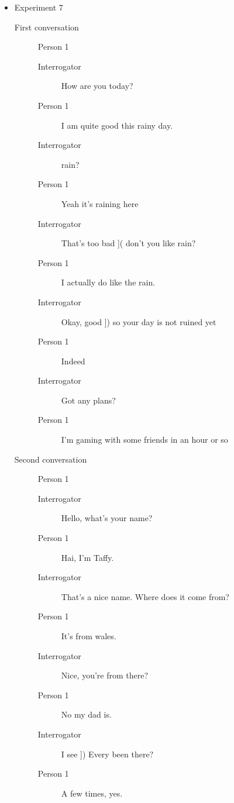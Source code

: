 \begin{itemize}
   \item Experiment 7
      \begin{description}
         \item [First conversation] Person 1
            \begin{description}
               \item [Interrogator] How are you today?
               \item [Person 1] I am quite good this rainy day.
               \item [Interrogator] rain?
               \item [Person 1] Yeah it's raining here
            \item [Interrogator] That's too bad ]( don't you like rain?
            \item [Person 1] I actually do like the rain.
         \item [Interrogator] Okay, good ]) so your day is not ruined yet
         \item [Person 1] Indeed
         \item [Interrogator] Got any plans?
         \item [Person 1] I'm gaming with some friends in an hour or so
      \end{description}
   \item [Second conversation] Person 1
      \begin{description}
         \item [Interrogator] Hello, what's your name?
         \item [Person 1] Hai, I'm Taffy.
         \item [Interrogator] That's a nice name. Where does it come from?
         \item [Person 1] It's from wales.
         \item [Interrogator] Nice, you're from there?
         \item [Person 1] No my dad is.
      \item [Interrogator] I see ]) Every been there?
      \item [Person 1] A few times, yes.
   \end{description}
      \end{description}


\end{itemize}
